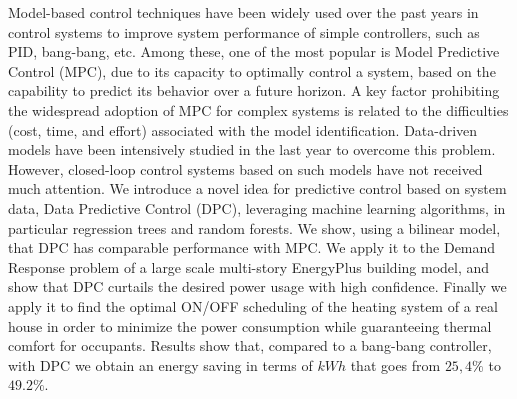 Model-based control techniques have been widely used over the past years in control systems to improve system performance of simple controllers, such as PID, bang-bang, etc. Among these, one of the most popular is Model Predictive Control (MPC), due to its capacity to optimally control a system, based on the capability to predict its behavior over a future horizon. A key factor prohibiting the widespread adoption of MPC for complex systems is related to the difficulties (cost, time, and effort) associated with the model identification. Data-driven models have been intensively studied in the last year to overcome this problem. However, closed-loop control systems based on such models have not received much attention. We introduce a novel idea for predictive control based on system data, Data Predictive Control (DPC), leveraging machine learning algorithms, in particular regression trees and random forests. We show, using a bilinear model, that DPC has comparable performance with MPC. We apply it to the Demand Response problem of a large scale multi-story EnergyPlus building model, and show that DPC curtails the desired power usage with high confidence. Finally we apply it to find the optimal ON/OFF scheduling of the heating system of a real house in order to minimize the power consumption while guaranteeing thermal comfort for occupants. Results show that, compared to a bang-bang controller, with DPC we obtain an energy saving in terms of $kWh$ that goes from $25,4\%$ to $49.2\%$.